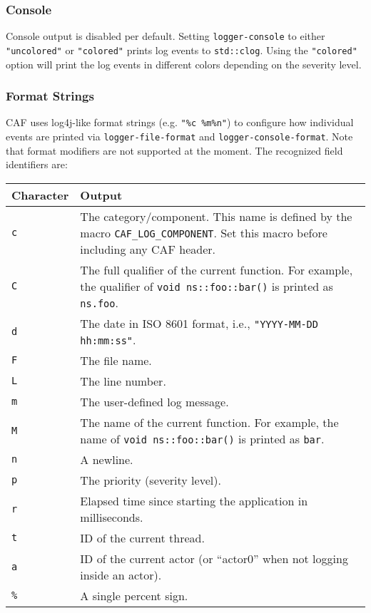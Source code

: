 \subsubsection{Console}
\label{log-output-console}

Console output is disabled per default. Setting \lstinline^logger-console^ to either \lstinline^"uncolored"^ or \lstinline^"colored"^ prints log events to \lstinline^std::clog^. Using the \lstinline^"colored"^ option will print the log events in different colors depending on the severity level.

\subsubsection{Format Strings}
\label{log-output-format-strings}

CAF uses log4j-like format strings (e.g. \lstinline^"%c %m%n"^) to configure how individual events are printed via \lstinline^logger-file-format^ and \lstinline^logger-console-format^. Note that format modifiers are not supported at the moment. The recognized field identifiers are:

\begin{tabular}{|p{}|p{}|}
  \hline
  \textbf{Character} & \textbf{Output} \\
  \hline
  \texttt{c} & The category/component. This name is defined by the macro \lstinline^CAF_LOG_COMPONENT^. Set this macro before including any CAF header. \\
  \hline
  \texttt{C} & The full qualifier of the current function. For example, the qualifier of \lstinline^void ns::foo::bar()^ is printed as \lstinline^ns.foo^. \\
  \hline
  \texttt{d} & The date in ISO 8601 format, i.e., \lstinline^"YYYY-MM-DD hh:mm:ss"^. \\
  \hline
  \texttt{F} & The file name. \\
  \hline
  \texttt{L} & The line number. \\
  \hline
  \texttt{m} & The user-defined log message. \\
  \hline
  \texttt{M} & The name of the current function. For example, the name of \lstinline^void ns::foo::bar()^ is printed as \lstinline^bar^. \\
  \hline
  \texttt{n} & A newline. \\
  \hline
  \texttt{p} & The priority (severity level). \\
  \hline
  \texttt{r} & Elapsed time since starting the application in milliseconds. \\
  \hline
  \texttt{t} & ID of the current thread. \\
  \hline
  \texttt{a} & ID of the current actor (or ``actor0'' when not logging inside an actor). \\
  \hline
  \texttt{\%} & A single percent sign. \\
  \hline
\end{tabular}

